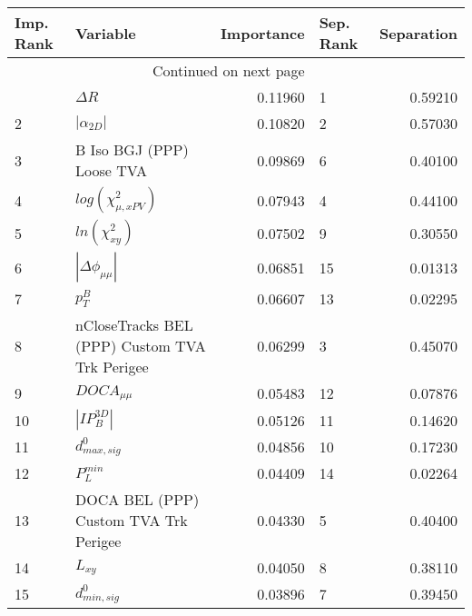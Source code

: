\usepackage{lscape}

\begin{landscape}
\begin{longtable}{llrlr}
\toprule
Imp. Rank &                                       Variable &  Importance & Sep. Rank &  Separation \\
\midrule
\endhead
\midrule
\multicolumn{3}{r}{{Continued on next page}} \\
\midrule
\endfoot

\bottomrule
\endlastfoot
        1 &                                     $\Delta R$ &     0.11960 &         1 &     0.59210 \\
        2 &                                $|\alpha_{2D}|$ &     0.10820 &         2 &     0.57030 \\
        3 &                      B Iso BGJ (PPP) Loose TVA &     0.09869 &         6 &     0.40100 \\
        4 &                      $log(\chi^{2}_{\mu,xPV})$ &     0.07943 &         4 &     0.44100 \\
        5 &                            $ln(\chi^{2}_{xy})$ &     0.07502 &         9 &     0.30550 \\
        6 &                       $|\Delta \phi_{\mu\mu}|$ &     0.06851 &        15 &     0.01313 \\
        7 &                                      $p^B_{T}$ &     0.06607 &        13 &     0.02295 \\
        8 &  nCloseTracks BEL (PPP) Custom TVA Trk Perigee &     0.06299 &         3 &     0.45070 \\
        9 &                                $DOCA_{\mu\mu}$ &     0.05483 &        12 &     0.07876 \\
       10 &                                $|IP_{B}^{3D}|$ &     0.05126 &        11 &     0.14620 \\
       11 &                               $d^0_{max, sig}$ &     0.04856 &        10 &     0.17230 \\
       12 &                                  $P^{min}_{L}$ &     0.04409 &        14 &     0.02264 \\
       13 &          DOCA BEL (PPP) Custom TVA Trk Perigee &     0.04330 &         5 &     0.40400 \\
       14 &                                       $L_{xy}$ &     0.04050 &         8 &     0.38110 \\
       15 &                               $d^0_{min, sig}$ &     0.03896 &         7 &     0.39450 \\
\end{longtable}

\end{landscape}
